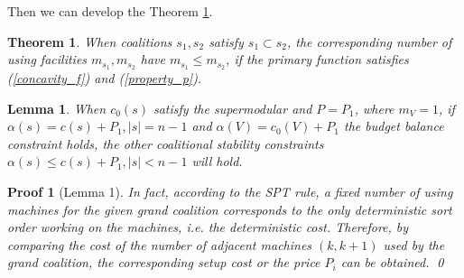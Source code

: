 \documentclass[UTF8]{article}
\newtheorem{thm}{\hspace{2em}Theorem}
\newtheorem{lem}{\hspace{2em}Lemma}
\newtheorem{pf}{\hspace{2em}Proof}
\begin{document}
Then we can develop the Theorem \ref{thm7}.

\begin{thm}\label{thm7}
When coalitions $s_1,s_2$ satisfy $s_1 \subset s_2$, the corresponding number of using facilities $ m_{s_1}, m_{s_2}$ have $m_{s_1} \leq m_{s_2}$, if the primary function satisfies  (\ref{concavity_f}) and (\ref{property_p}).
\end{thm}



\begin{lem}\label{lem4}
When $c_0(s)$ satisfy the supermodular and $P=P_1$, where $m_V=1$, if $\alpha(s)=c(s)+P_1, \left| s \right|= n-1$ and $\alpha(V)=c_0(V)+P_1$ the budget balance constraint holds, the other coalitional stability constraints $\alpha(s) \leq c(s)+P_1, \left| s \right| < n-1$ will hold.
\end{lem}

\begin{pf}[Lemma 1]
  In fact, according to the SPT rule, a fixed number of using machines for the given grand coalition corresponds to the only deterministic sort order working on the machines, i.e. the deterministic cost. Therefore, by comparing the cost of the number of adjacent machines $(k, k + 1)$ used by the grand coalition, the corresponding setup cost or the price $P_i$ can be obtained.
  \qed
\end{pf}
\end{document}
